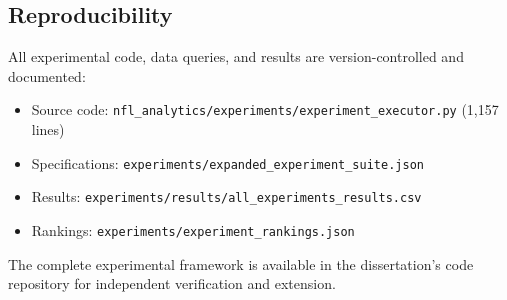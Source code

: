 \subsection{Reproducibility}

All experimental code, data queries, and results are version-controlled and documented:
\begin{itemize}
    \item Source code: \texttt{nfl\_analytics/experiments/experiment\_executor.py} (1,157 lines)
    \item Specifications: \texttt{experiments/expanded\_experiment\_suite.json}
    \item Results: \texttt{experiments/results/all\_experiments\_results.csv}
    \item Rankings: \texttt{experiments/experiment\_rankings.json}
\end{itemize}

The complete experimental framework is available in the dissertation's code repository for independent verification and extension.
